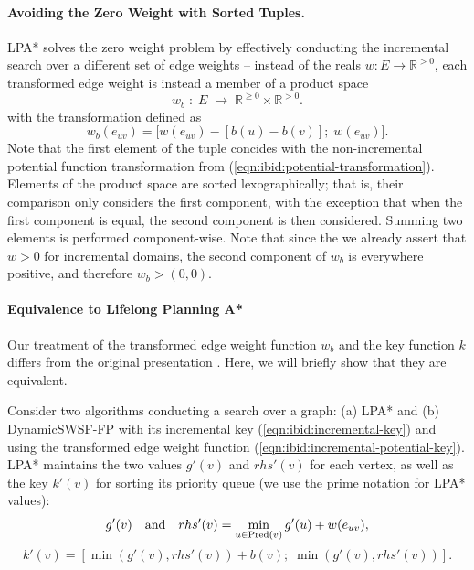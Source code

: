 \paragraph{Avoiding the Zero Weight with Sorted Tuples.}
LPA* solves the zero weight problem by effectively conducting
the incremental search over a different set of edge weights --
instead of the reals $w : E \rightarrow \mathbb{R}^{> 0}$,
each transformed edge weight is instead a member of a product space
\begin{equation}
   w_b \;:\; E \;\rightarrow\; \mathbb{R}^{\geq 0} \!\times\! \mathbb{R}^{> 0}.
\end{equation}
with the transformation defined as
\begin{equation}
   w_b(e_{uv}) = \big[ w(e_{uv}) - [b(u) - b(v)]; \; w(e_{uv}) \big].
   \label{eqn:ibid:incremental-potential-key}
\end{equation}
Note that the first element of the tuple concides with the
non-incremental potential function transformation from
(\ref{eqn:ibid:potential-transformation}).
Elements of the product space are sorted lexographically;
that is, their comparison only considers the first component,
with the exception that when the first component is equal,
the second component is then considered.
Summing two elements is performed component-wise.
Note that since the we already assert that $w > 0$ for incremental
domains,
the second component of $w_b$ is everywhere positive,
and therefore $w_b > (0,0)$.

\paragraph{Equivalence to Lifelong Planning A*}
Our treatment of the transformed edge weight function $w_b$
and the key function $k$ differs from the original presentation
\citep{koenig2004lpastar}.
Here,
we will briefly show that they are equivalent.

Consider two algorithms conducting a search over a graph:
(a) LPA*
and (b) DynamicSWSF-FP with its incremental key
(\ref{eqn:ibid:incremental-key}) and using the transformed
edge weight function (\ref{eqn:ibid:incremental-potential-key}).
LPA* maintains the two values $g'(v)$ and $rhs'(v)$ for each vertex,
as well as the key $k'(v)$ for sorting its priority queue
(we use the prime notation for LPA* values):
\begin{equation}
   g'(v) \quad\mbox{and}\quad rhs'(v) = \min_{u \in \mbox{\scriptsize Pred}(v)} g'(u) + w(e_{uv}),
\end{equation}%
\begin{equation}
   k'(v) = \left[ \min\!\left( g'(v), rhs'(v) \right) + b(v);\;
      \min\!\left( g'(v), rhs'(v) \right) \right].
\end{equation}

